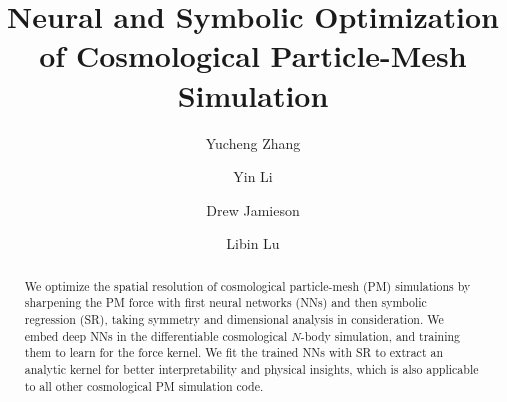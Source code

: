 \documentclass[modern, trackchanges, dvipsnames]{aastex631}
\begin{document}
\title{\large Neural and Symbolic Optimization of Cosmological
Particle-Mesh Simulation
\vspace{0.3em}}


\author[0000-0002-9300-2632]{\normalsize Yucheng Zhang}

\author[0000-0002-0701-1410]{\normalsize Yin Li}

\author[0000-0001-5044-7204]{\normalsize Drew Jamieson}

\author[0000-0003-0745-9431]{\normalsize Libin Lu}








\begin{abstract}

We optimize the spatial resolution of cosmological particle-mesh (PM)
simulations by sharpening the PM force with first neural networks (NNs)
and then symbolic regression (SR), taking symmetry and dimensional
analysis in consideration.
We embed deep NNs in the differentiable cosmological $N$-body
simulation, and training them to learn for the force kernel.
We fit the trained NNs with SR to extract an analytic kernel for better
interpretability and physical insights, which is also applicable to all
other cosmological PM simulation code.

\end{abstract}


\vspace{1em}
\end{document}

